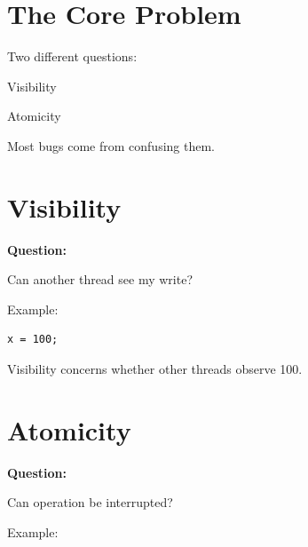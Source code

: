 \documentclass[11pt,a4paper]{book}
\begin{document}

\section{The Core Problem}

Two different questions:


Visibility


Atomicity


Most bugs come from confusing them.


\section{Visibility}

\textbf{Question:}


Can another thread see my write?


Example:

\begin{verbatim} 
x = 100;
\end{verbatim}


Visibility concerns whether
other threads observe 100.


\section{Atomicity}

\textbf{Question:}


Can operation be interrupted?


Example:
\end{document}
